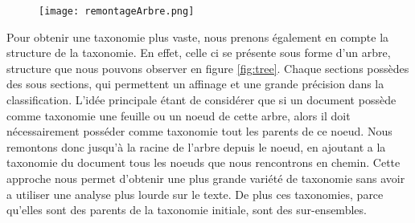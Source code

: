 \begin{figure}[h!]
  \centering
  \texttt{[image: remontageArbre.png]}
	\caption[]{}
  \label{}
\end{figure}

Pour obtenir une taxonomie plus vaste, nous prenons également en compte la structure de la taxonomie. En effet, celle ci se présente sous forme d'un arbre, structure que nous pouvons observer en figure \ref{fig:tree}. Chaque sections possèdes des sous sections, qui permettent un affinage et une grande précision dans la classification.
L'idée principale étant de considérer que si un document possède comme taxonomie une feuille ou un noeud de cette arbre, alors il doit nécessairement posséder comme taxonomie tout les parents de ce noeud.
Nous remontons donc jusqu'à la racine de l'arbre depuis le noeud, en ajoutant a la taxonomie du document tous les noeuds que nous rencontrons en chemin.
Cette approche nous permet d'obtenir une plus grande variété de taxonomie sans avoir a utiliser une analyse plus lourde sur le texte.
De plus ces taxonomies, parce qu'elles sont des parents de la taxonomie initiale, sont des sur-ensembles.

